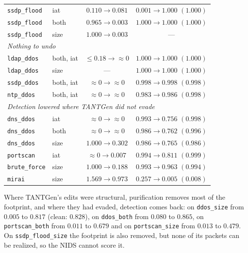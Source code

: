 \begin{table}[tp]
\begin{tabular}{llcc}
\texttt{ssdp\_flood} & iat  & $0.110 \rightarrow 0.081$ & $0.001 \rightarrow 1.000$ $(1.000)$ \\
\texttt{ssdp\_flood} & both & $0.965 \rightarrow 0.003$ & $1.000 \rightarrow 1.000$ $(1.000)$ \\
\texttt{ssdp\_flood} & size & $1.000 \rightarrow 0.003$ & --- \\
\midrule
\multicolumn{4}{l}{\emph{Nothing to undo}}\\
\texttt{ldap\_ddos}  & both, iat & $\leq 0.18 \rightarrow \approx 0$ & $1.000 \rightarrow 1.000$ $(1.000)$ \\
\texttt{ldap\_ddos}  & size & --- & $1.000 \rightarrow 1.000$ $(1.000)$ \\
\texttt{ssdp\_ddos}  & both, iat & $\approx 0 \rightarrow \approx 0$ & $0.998 \rightarrow 0.998$ $(0.998)$ \\
\texttt{ntp\_ddos}   & both, iat & $\approx 0 \rightarrow \approx 0$ & $0.983 \rightarrow 0.986$ $(0.998)$ \\
\midrule
\multicolumn{4}{l}{\emph{Detection lowered where TANTGen did not evade}}\\
\texttt{dns\_ddos}   & iat  & $\approx 0 \rightarrow \approx 0$ & $0.993 \rightarrow 0.756$ $(0.998)$ \\
\texttt{dns\_ddos}   & both & $\approx 0 \rightarrow \approx 0$ & $0.986 \rightarrow 0.762$ $(0.996)$ \\
\texttt{dns\_ddos}   & size & $1.000 \rightarrow 0.302$ & $0.986 \rightarrow 0.765$ $(0.986)$ \\
\texttt{portscan}    & iat  & $\approx 0 \rightarrow 0.007$ & $0.994 \rightarrow 0.811$ $(0.999)$ \\
\texttt{brute\_force}& size & $1.000 \rightarrow 0.188$ & $0.993 \rightarrow 0.963$ $(0.994)$ \\
\texttt{mirai}       & size & $1.569 \rightarrow 0.973$ & $0.257 \rightarrow 0.005$ $(0.008)$ \\
\bottomrule
\end{tabular}
\end{table}

Where TANTGen's edits were structural, purification removes most of the footprint, and
where they had evaded, detection comes back: on \texttt{ddos\_size} from $0.005$ to
$0.817$ (clean: $0.828$), on \texttt{ddos\_both} from $0.080$ to $0.865$, on
\texttt{portscan\_both} from $0.011$ to $0.679$ and on \texttt{portscan\_size} from
$0.013$ to $0.479$. On \texttt{ssdp\_flood\_size} the footprint is also removed, but none
of its packets can be realized, so the \ac{NIDS} cannot score it.

